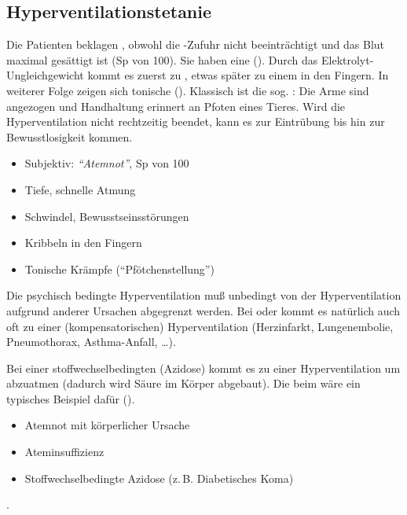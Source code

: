 \documentclass[
ngerman,
paper=a4,
asymmetric,
fontsize=10pt,
draft=false,
numbers=noenddot,
bibtotocnumbered,
footnotes=multiple,
]{scrreprt}
\newcommand{\jALT}{\vspace{6pt}\noindent{\color{red}\sffamily\textbf{DELETED}\hrulefill\newline}}
\newcommand{\jALTende}{\newline{\color{red}\rule{\linewidth}{2pt}\newline}}
\newcommand{\jNEUende}{\newline{\color{green}\rule{\linewidth}{3pt}\newline}}
\begin{document}
\jNEUende


\subsection{Hyperventilationstetanie}
\jALT
 
{%
Die Patienten beklagen , obwohl die
-Zufuhr nicht beeinträchtigt und das Blut maximal
gesättigt ist (Sp von 100\PC*). Sie haben eine
 ().
Durch das Elektrolyt-Ungleichgewicht kommt es zuerst zu
, etwas später zu einem  in den
Fingern. In weiterer Folge zeigen sich tonische  
().
Klassisch ist die sog.
: Die Arme sind
angezogen und Handhaltung erinnert an Pfoten eines Tieres.
Wird die Hyperventilation nicht rechtzeitig beendet, kann es
zur Eintrübung bis hin zur Bewusstlosigkeit kommen.
}{
\begin{itemize}
  \item Subjektiv: \emph{\protect\enquote{Atemnot}}, Sp von 100\PC* 
  \item Tiefe, schnelle Atmung
  \item Schwindel, Bewusstseinsstörungen
  \item Kribbeln in den Fingern
  \item Tonische Krämpfe (\protect\enquote{Pfötchenstellung})
\end{itemize}
}{}{}{}
 
 

{%
Die psychisch bedingte Hyperventilation muß unbedingt von
der Hyperventilation aufgrund anderer Ursachen abgegrenzt
werden. Bei  oder  kommt es natürlich auch
oft zu einer (kompensatorischen) Hyperventilation
(Herzinfarkt, Lungenembolie, Pneumothorax, Asthma-Anfall,
\ldots).

Bei einer stoffwechselbedingten  (Azidose)
kommt es zu einer Hyperventilation um  abzuatmen
(dadurch wird Säure im Körper abgebaut). Die
 beim  wäre
ein typisches Beispiel dafür
().

}{
\begin{itemize}
  \item Atemnot mit körperlicher Ursache
  \item Ateminsuffizienz
  \item Stoffwechselbedingte Azidose (z.\,B. Diabetisches Koma)
\end{itemize}
}{}{}{}
.
\jALTende
\end{document}

